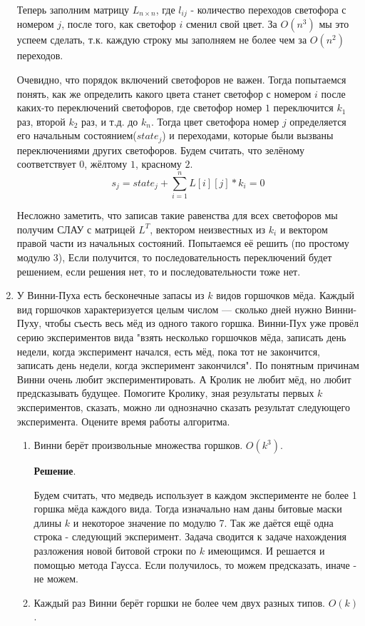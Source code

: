 \begin{enumerate}
	Теперь заполним матрицу $L_{n\times n}$, где $l_{ij}$ - количество переходов светофора с номером $j$, после 
	того, как светофор $i$ сменил свой цвет. За $O(n^3)$ мы это успеем сделать, т.к. каждую строку мы заполняем 
	не более чем за $O(n^2)$ переходов. 
	
	Очевидно, что порядок включений светофоров не важен. Тогда попытаемся понять, как же определить какого цвета 
	станет светофор с номером $i$ после каких-то переключений светофоров, где светофор номер $1$ переключится 
	$k_1$ раз, второй $k_2$ раз, и т.д. до $k_n$. Тогда цвет светофора номер $j$ определяется его начальным 
	состоянием($state_j$) и переходами, которые были вызваны переключениями других светофоров. Будем считать, что 
	зелёному соответствует $0$, жёлтому $1$, красному $2$.
	\begin{equation*}
		s_j = state_j + \sum\limits_{i = 1}^{n} L[i][j] * k_i = 0
	\end{equation*}
	
	Несложно заметить, что записав такие равенства для всех светофоров мы получим СЛАУ с матрицей $L^T$, вектором 
	неизвестных из $k_i$ и вектором правой части из начальных состояний. Попытаемся её решить (по простому модулю 
	3), Если получится, то последовательность переключений будет решением, если решения нет, то и 
	последовательности тоже нет.
	 
	\item У Винни-Пуха есть бесконечные запасы из $k$ видов горшочков мёда. Каждый вид горшочков характеризуется 
	целым числом — сколько дней нужно Винни-Пуху, чтобы съесть весь мёд из одного такого горшка. Винни-Пух уже 
	провёл серию экспериментов вида "взять несколько горшочков мёда, записать день недели, когда эксперимент 
	начался, есть мёд, пока тот не закончится, записать день недели, когда эксперимент закончился". По понятным 
	причинам Винни очень любит экспериментировать. А Кролик не любит мёд, но любит предсказывать будущее. 
	Помогите Кролику, зная результаты первых $k$ экспериментов, сказать, можно ли однозначно сказать результат 
	следующего эксперимента. Оцените время работы алгоритма.
	\begin{enumerate}
		\item Винни берёт произвольные множества горшков. $O(k^3)$.
		
		\textbf{Решение}. 
		
		Будем считать, что медведь использует в каждом эксперименте не более 1 горшка мёда каждого вида. Тогда 
		изначально нам даны битовые маски длины $k$ и некоторое значение по модулю 7. Так же даётся ещё одна 
		строка - следующий эксперимент. Задача сводится к задаче нахождения разложения новой битовой строки по 
		$k$ имеющимся. И решается и помощью метода Гаусса. Если получилось, то можем предсказать, иначе - не 
		можем. 
		\item Каждый раз Винни берёт горшки не более чем двух разных типов. $O(k)$.
		

\end{enumerate}
\end{enumerate}

